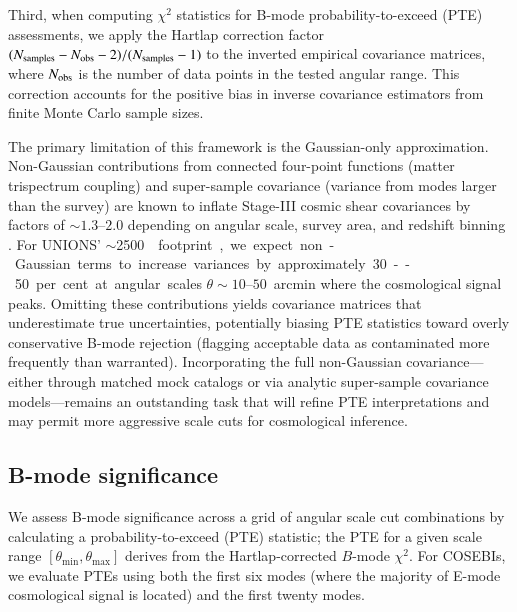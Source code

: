 \documentclass{aa}
\begin{document}
Third, when computing $\chi^2$ statistics for B-mode probability-to-exceed (PTE) assessments, we apply the Hartlap correction factor $(N_{\rm samples} - N_{\rm obs} - 2)/(N_{\rm samples} - 1)$ \citep{hartlap07} to the inverted empirical covariance matrices, where $N_{\rm obs}$ is the number of data points in the tested angular range. This correction accounts for the positive bias in inverse covariance estimators from finite Monte Carlo sample sizes.

The primary limitation of this framework is the Gaussian-only approximation. Non-Gaussian contributions from connected four-point functions (matter trispectrum coupling) and super-sample covariance (variance from modes larger than the survey) are known to inflate Stage-III cosmic shear covariances by factors of $\sim 1.3$--$2.0$ depending on angular scale, survey area, and redshift binning \citep{joachimi.etal08, krause.eifler17}. For UNIONS' $\sim$\SI{2500}{\square\deg} footprint, we expect non-Gaussian terms to increase variances by approximately \num{30}--\num{50}~per~cent at angular scales $\theta \sim 10$--$50$~arcmin where the cosmological signal peaks. Omitting these contributions yields covariance matrices that underestimate true uncertainties, potentially biasing PTE statistics toward overly conservative B-mode rejection (flagging acceptable data as contaminated more frequently than warranted). Incorporating the full non-Gaussian covariance—either through matched mock catalogs or via analytic super-sample covariance models—remains an outstanding task that will refine PTE interpretations and may permit more aggressive scale cuts for cosmological inference.

\subsection{B-mode significance}
\label{sec:scale_cuts}

We assess B-mode significance across a grid of angular scale cut combinations by calculating a probability-to-exceed (PTE) statistic; the PTE for a given scale range $[\theta_{\mathrm{min}}, \theta_{\mathrm{max}}]$ derives from the Hartlap-corrected $B$-mode $\chi^2$.
For COSEBIs, we evaluate PTEs using both the first six modes (where the majority of E-mode cosmological signal is located) and the first twenty modes.
\end{document}
